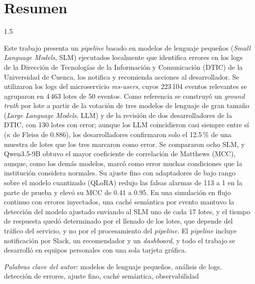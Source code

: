 \chapter*{Resumen}

\begin{spacing}{1.5}

Este trabajo presenta un \textit{pipeline} basado en modelos de lenguaje pequeños (\textit{Small Language Models}, SLM) ejecutados localmente que identifica errores en los logs de la Dirección de Tecnologías de la Información y Comunicación (DTIC) de la Universidad de Cuenca, los notifica y recomienda acciones al desarrollador. Se utilizaron los logs del microservicio \textit{ms-users}, cuyos 223\,104 eventos relevantes se agruparon en 4\,463 lotes de 50 eventos. Como referencia se construyó un \textit{ground truth} por lote a partir de la votación de tres modelos de lenguaje de gran tamaño (\textit{Large Language Models}, LLM) y de la revisión de dos desarrolladores de la DTIC, con 130 lotes con error; aunque los LLM coincidieron casi siempre entre sí ($\kappa$ de Fleiss de 0.886), los desarrolladores confirmaron solo el 12.5\,\% de una muestra de lotes que los tres marcaron como error. Se compararon ocho SLM, y Qwen3.5-9B obtuvo el mayor coeficiente de correlación de Matthews (MCC), aunque, como los demás modelos, marcó como error muchas condiciones que la institución considera normales. Su ajuste fino con adaptadores de bajo rango sobre el modelo cuantizado (QLoRA) redujo las falsas alarmas de 113 a 1 en la parte de prueba y elevó su MCC de 0.41 a 0.95. En una simulación en flujo continuo con errores inyectados, una caché semántica por evento mantuvo la detección del modelo ajustado enviando al SLM uno de cada 17 lotes, y el tiempo de respuesta quedó determinado por el llenado de los lotes, que depende del tráfico del servicio, y no por el procesamiento del \textit{pipeline}. El \textit{pipeline} incluye notificación por Slack, un recomendador y un \textit{dashboard}, y todo el trabajo se desarrolló en equipos personales con una sola tarjeta gráfica.

\end{spacing}

\hspace{1.27cm}\textit{Palabras clave del autor:} modelos de lenguaje pequeños, análisis de logs, detección de errores, ajuste fino, caché semántica, observabilidad

\vfill %

